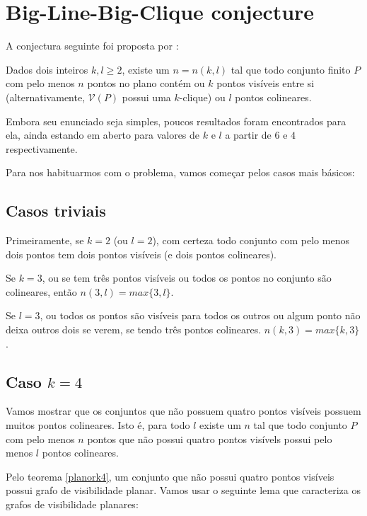 \chapter{Big-Line-Big-Clique conjecture} A conjectura seguinte foi proposta por \cite{visibilitygraph}:
\begin{conjectura}\label{conj1}
    Dados dois inteiros $k,l\geq2$, existe um $n=n(k,l)$ tal que todo conjunto finito $P$ com pelo menos $n$ pontos no plano contém ou $k$ pontos visíveis entre si (alternativamente, $\mathcal V(P)$ possui uma $k$-clique) ou $l$ pontos colineares.
\end{conjectura}
Embora seu enunciado seja simples, poucos resultados foram encontrados para ela, ainda estando em aberto para valores de $k$ e $l$ a partir de $6$ e $4$ respectivamente.

Para nos habituarmos com o problema, vamos começar pelos casos mais básicos:

\section{Casos triviais}
Primeiramente, se $k=2$ (ou $l=2$), com certeza todo conjunto com pelo menos dois pontos tem dois pontos visíveis (e dois pontos colineares).

Se $k=3$, ou se tem três pontos visíveis ou todos os pontos no conjunto são colineares, então $n(3,l)=max\{3,l\}$.

Se $l=3$, ou todos os pontos são visíveis para todos os outros ou algum ponto não deixa outros dois se verem, se tendo três pontos colineares. $n(k,3) = max\{k,3\}$.


\section{Caso $k=4$}
Vamos mostrar que os conjuntos que não possuem quatro pontos visíveis possuem muitos pontos colineares. Isto é, para todo $l$ existe um $n$ tal que todo conjunto $P$ com pelo menos $n$ pontos que não possui quatro pontos visívels possui pelo menos $l$ pontos colineares.

Pelo teorema \ref{planork4}, um conjunto que não possui quatro pontos visíveis possui grafo de visibilidade planar. Vamos usar o seguinte lema que caracteriza os grafos de visibilidade planares:


